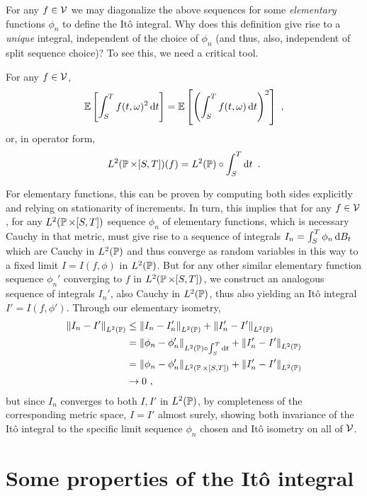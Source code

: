 \documentclass{article}
\begin{document}
For any \(f\in\mcV\) we may diagonalize the above sequences for some {\em elementary} functions \(\phi_n\) to define the It\^{o} integral. Why does this definition give rise to a {\em unique} integral, independent of the choice of \(\phi_n\) (and thus, also, independent of split sequence choice)? To see this, we need a critical tool.

\begin{lemma}[It\^{o} Isometry]
  For any \(f\in \mcV\),
  \[
    \E\ha{\int_S^Tf(t, \omega)^2\d{t}}
    = \E\ha{\pa{\int_S^Tf(t, \omega)\d{t}}^2}\,\,,
  \]
  or, in operator form,
  \[L^2(\P \times [S, T])(f)=L^2(\P)\circ \int_S^T\d{t}\,\,.\]
\end{lemma}

For elementary functions, this can be proven by computing both sides explicitly and relying on stationarity of increments. In turn, this implies that for any \(f\in\mcV\), for any \(L^2(\P \times [S,T])\) sequence \(\phi_n\) of elementary functions, which is necessary Cauchy in that metric, must give rise to a sequence of integrals \(I_n=\int_S^T\phi_n\d{B_t}\) which are Cauchy in \(L^2(\P)\) and thus converge as random variables in this way to a fixed limit \(I = I(f, \phi)\) in \(L^2(\P)\). But for any other similar elementary function sequence \(\phi_n'\) converging to \(f\) in \(L^2(\P \times [S,T])\), we construct an analogous sequence of integrals \(I_n'\), also Cauchy in \(L^2(\P)\), thus also yielding an It\^{o} integral \(I'=I(f, \phi')\). Through our elementary isometry,
\begin{align*}
  \norm{I_n-I'}_{L^2(\P)}&\le\norm{I_n-I_n'}_{L^2(\P)}+\norm{I_n'-I'}_{L^2(\P)}\\
                         &=\norm{\phi_n-\phi_n'}_{L^2(\P)\circ\int_S^T\d{t}}+\norm{I_n'-I'}_{L^2(\P)}\\
                         &=\norm{\phi_n-\phi_n'}_{L^2(\P\times[S,T])}+\norm{I_n'-I'}_{L^2(\P)}\\
                           &\rightarrow 0\,\,,
\end{align*}
but since \(I_n\) converges to both \(I,I'\) in \(L^2(\P)\), by completeness of the corresponding metric space, \(I=I'\) almost surely, showing both invariance of the It\^{o} integral to the specific limit sequence \(\phi_n\) chosen and It\^{o} isometry on all of \(\mcV\).

\section{Some properties of the It\^{o} integral}
\end{document}
